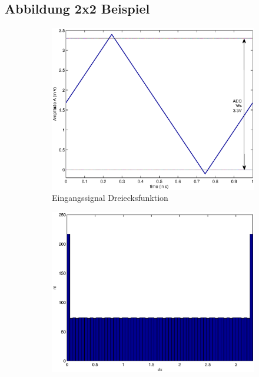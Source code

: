 \documentclass[TGAI_Laborbericht.tex]{subfiles}
\begin{document}
\subsection{Abbildung 2x2 Beispiel}
\begin{figure}[H]
	\begin{subfigure}{.499\textwidth}
		\centering\small
		\includegraphics[width=\textwidth]{media/matlab/HISTOGRAM/ramp_fkt_samples_5000.eps}
		\caption{Eingangssignal Dreiecksfunktion}
		\label{fig:GRUNDL_RAMP_RAMP_2X2}
	\end{subfigure}
	\begin{subfigure}{.499\textwidth}
		\centering\small
		\includegraphics[width=\textwidth]{media/matlab/HISTOGRAM/ramp_hist_samples_5000.eps}

\end{subfigure}
\end{figure}
\end{document}
